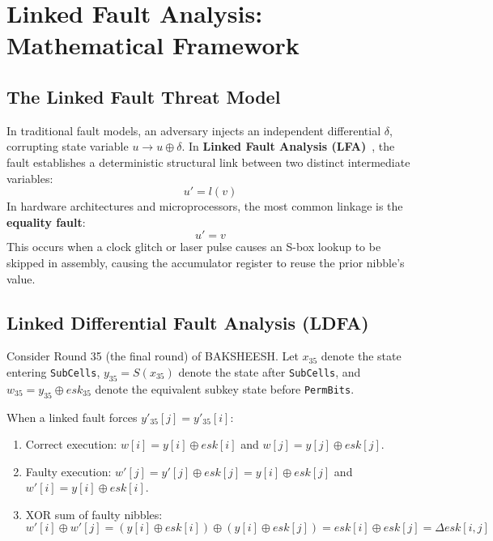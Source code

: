 \chapter{Linked Fault Analysis: Mathematical Framework}
\label{ch:lfa}

\section{The Linked Fault Threat Model}
\label{sec:lfa_model}
In traditional fault models, an adversary injects an independent differential $\delta$, corrupting state variable $u \to u \oplus \delta$. In \textbf{Linked Fault Analysis (LFA)}~\cite{beigizad2024linked}, the fault establishes a deterministic structural link between two distinct intermediate variables:
\begin{equation}
    u' = l(v)
\end{equation}
In hardware architectures and microprocessors, the most common linkage is the \textbf{equality fault}:
\begin{equation}
    u' = v
\end{equation}
This occurs when a clock glitch or laser pulse causes an S-box lookup to be skipped in assembly, causing the accumulator register to reuse the prior nibble's value.

\section{Linked Differential Fault Analysis (LDFA)}
\label{sec:ldfa_math}
Consider Round 35 (the final round) of BAKSHEESH. Let $x_{35}$ denote the state entering \texttt{SubCells}, $y_{35} = S(x_{35})$ denote the state after \texttt{SubCells}, and $w_{35} = y_{35} \oplus esk_{35}$ denote the equivalent subkey state before \texttt{PermBits}.

When a linked fault forces $y'_{35}[j] = y'_{35}[i]$:
\begin{enumerate}
    \item Correct execution: $w[i] = y[i] \oplus esk[i]$ and $w[j] = y[j] \oplus esk[j]$.
    \item Faulty execution: $w'[j] = y'[j] \oplus esk[j] = y[i] \oplus esk[j]$ and $w'[i] = y[i] \oplus esk[i]$.
    \item XOR sum of faulty nibbles:
    \begin{equation}
        w'[i] \oplus w'[j] = (y[i] \oplus esk[i]) \oplus (y[i] \oplus esk[j]) = esk[i] \oplus esk[j] = \Delta esk[i, j]
    \end{equation}
\end{enumerate}

